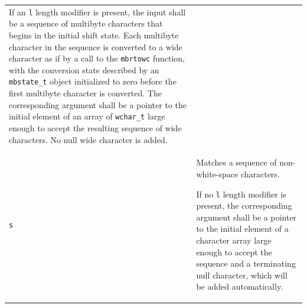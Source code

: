 \begin{longtable}{p{}p{}}
If an \texttt{l} length modifier is present, the input shall be a sequence of
multibyte characters that begins in the initial shift state. Each multibyte
character in the sequence is converted to a wide character as if by a call to
the \texttt{mbrtowc} function, with the conversion state described by an
\texttt{mbstate\_t} object initialized to zero before the first multibyte
character is converted. The corresponding argument shall be a pointer to the
initial element of an array of \texttt{wchar\_t} large enough to accept the
resulting sequence of wide characters. No null wide character is added.\\
\texttt{s}&Matches a sequence of non-white-space
characters.\footnotemark[\value{footnote}]

If no \texttt{l} length modifier is present, the corresponding argument shall
be a pointer to the initial element of a character array large enough to accept
the sequence and a terminating null character, which will be added
automatically.


\end{longtable}
